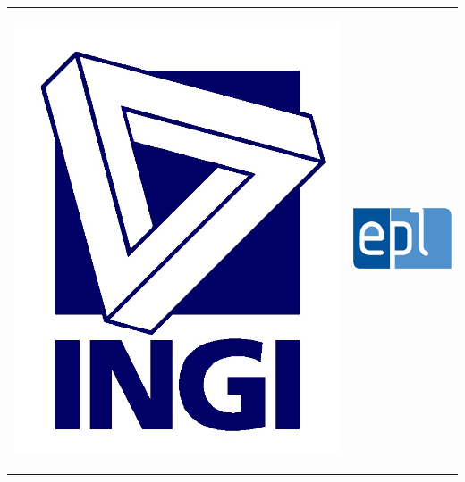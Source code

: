 \documentclass[10pt, a4paper, oneside]{article} %
\begin{document}
\begin{titlepage}

\begin{tabular}{cc}

\begin{minipage}{0.49\textwidth}
\begin{flushleft}
\includegraphics[scale=0.1]{./Figures/logoingisbleu.jpg} %
\end{flushleft}
\end{minipage}

&
 \begin{minipage}{0.42\textwidth}
\begin{flushright}
\includegraphics[scale=0.5]{./Figures/epl.jpg} %
\end{flushright}
\end{minipage}
\end{tabular} 




\end{titlepage}
\end{document}
